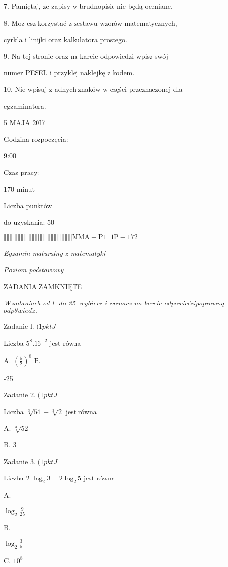 \documentclass[a4paper,12pt]{article}
\begin{document}
7. Pamiętaj, $\dot{\mathrm{z}}\mathrm{e}$ zapisy w brudnopisie nie będą oceniane.

8. $\mathrm{M}\mathrm{o}\dot{\mathrm{z}}$ esz korzystać z zestawu wzorów matematycznych,

cyrkla i linijki oraz kalkulatora prostego.

9. Na tej stronie oraz na karcie odpowiedzi wpisz swój

numer PESEL i przyklej naklejkę z kodem.

10. Nie wpisuj $\dot{\mathrm{z}}$ adnych znaków w części przeznaczonej dla

egzaminatora.

5 MAJA 20I7

Godzina rozpoczęcia:

9:00

Czas pracy:

170 minut

Liczba punktów

do uzyskania: 50

$\Vert\Vert\Vert\Vert\Vert\Vert\Vert\Vert\Vert\Vert\Vert\Vert\Vert\Vert\Vert\Vert\Vert\Vert\Vert\Vert\Vert\Vert\Vert\Vert|  \mathrm{M}\mathrm{M}\mathrm{A}-\mathrm{P}1_{-}1\mathrm{P}-172$




{\it Egzamin maturalny z matematyki}

{\it Poziom podstawowy}

ZADANIA ZAMKNIĘTE

{\it Wzadaniach od l. do 25. wybierz i zaznacz na karcie odpowiedzipoprawnq} $odp\theta wied\acute{z}.$

Zadanie l. $(1pktJ$

Liczba $5^{8}.16^{-2}$ jest równa

A. $(\displaystyle \frac{5}{2})^{8}$ B.

-25

Zadanie 2. $(1pktJ$

Liczba $\sqrt[3]{54}-\sqrt[3]{2}$ jest równa

A. $\sqrt[3]{52}$

B. 3

Zadanie 3. $(1pktJ$

Liczba 2 $\log_{2}3-2\log_{2}5$ jest równa

A.

$\displaystyle \log_{2}\frac{9}{25}$

B.

$\log_{2} \displaystyle \frac{3}{5}$

C. $10^{8}$
\end{document}
